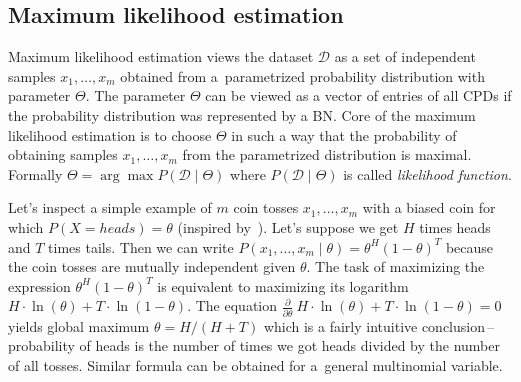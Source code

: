 \documentclass[english,cover]{fitthesis} %
\newcommand{\term}[1]{\emph{#1}}           %
\begin{document}
\subsection{Maximum likelihood estimation}
Maximum likelihood estimation views the dataset $\mathcal{D}$ as a set of independent samples $x_1, \dots, x_m$ obtained from a~parametrized probability distribution with parameter $\Theta$. The parameter $\Theta$ can be viewed as a vector of entries of all CPDs if the probability distribution was represented by a BN. Core of the maximum likelihood estimation is to choose $\Theta$ in such a way that the probability of obtaining samples $x_1, \dots, x_m$ from the parametrized distribution is maximal. Formally $\Theta = \arg \max P(\mathcal{D} \mid \Theta)$ where $P(\mathcal{D} \mid \Theta)$ is called \term{likelihood function}.

Let's inspect a simple example of $m$ coin tosses $x_1, \dots, x_m$ with a biased coin for which $P(X = heads) = \theta$ (inspired by~\cite{pgm}). Let's suppose we get $H$ times heads and $T$ times tails. Then we can write $P(x_1,\dots,x_m \mid \theta) = \theta^H (1 - \theta)^T$ because the coin tosses are mutually independent given $\theta$. The task of maximizing the expression $\theta^H (1 - \theta)^T$ is equivalent to maximizing its logarithm $H \cdot \ln(\theta) + T \cdot \ln(1 - \theta)$. The equation $\frac{\partial}{\partial\theta} \ H \cdot \ln(\theta) + T \cdot \ln(1 - \theta) = 0$ yields global maximum $\theta = H / (H + T)$ which is a fairly intuitive conclusion\,--\,probability of heads is the number of times we got heads divided by the number of all tosses. Similar formula can be obtained for a~general multinomial variable.
\end{document}
